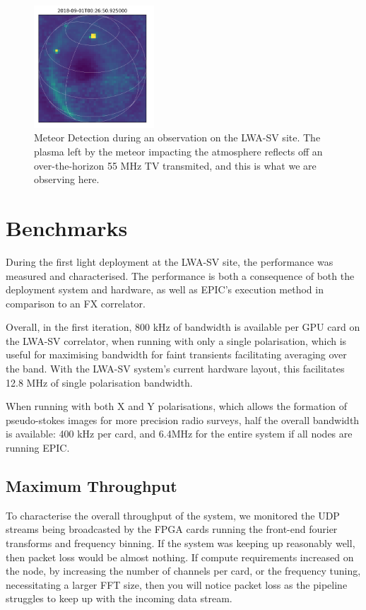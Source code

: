 \documentclass[bibliography=totocnumbered, twocolumn]{article}
\begin{document}
\begin{figure}
  \centering
  \includegraphics[width=0.4\textwidth]{images/meteor.png}
  \caption{Meteor Detection during an observation on the LWA-SV site. The plasma left by the meteor impacting the atmosphere reflects off an over-the-horizon 55 MHz TV transmited, and this is what we are observing here.}
  \label{fig:meteor}
\end{figure}


\section{Benchmarks} \label{sec:benchmarks}

During the first light deployment at the LWA-SV site, the
performance was measured and characterised. The performance
is both a consequence of both the deployment system and
hardware, as well as EPIC's execution method in comparison
to an FX correlator.

Overall, in the first iteration, 800 kHz of bandwidth is available
per GPU card on the LWA-SV correlator, when running with only
a single polarisation, which is useful for maximising bandwidth
for faint transients facilitating averaging over the band. With
the LWA-SV system's current hardware layout, this facilitates
12.8 MHz of single polarisation bandwidth.

When running with both X and Y polarisations, which allows the
formation of pseudo-stokes images for more precision radio
surveys, half the overall bandwidth is available: 400 kHz
per card, and 6.4MHz for the entire system if all nodes are
running EPIC.

\subsection{Maximum Throughput}

To characterise the overall throughput of the system, we monitored
the UDP streams being broadcasted by the FPGA cards running the
front-end fourier transforms and frequency binning. If the
system was keeping up reasonably well, then packet loss would be
almost nothing. If compute requirements increased on the node,
by increasing the number of channels per card, or the frequency
tuning, necessitating a larger FFT size, then you will notice
packet loss as the pipeline struggles to keep up with the
incoming data stream.
\end{document}

